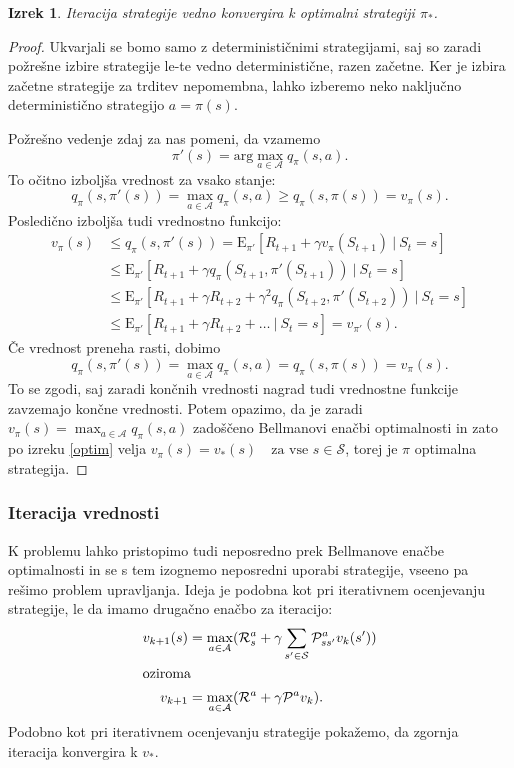 \documentclass[12pt,a4paper]{amsart}
\theoremstyle{definition} %
\theoremstyle{plain} %
\newtheorem{izrek}[definicija]{Izrek}
\begin{document}
\begin{izrek}\label{iterKonv}
    Iteracija strategije vedno konvergira k optimalni strategiji $\pi_*$.
\end{izrek}

\begin{proof}
    Ukvarjali se bomo samo z determinističnimi strategijami, saj so zaradi požrešne izbire 
    strategije le-te vedno deterministične, razen začetne. Ker je izbira začetne strategije za 
    trditev nepomembna, lahko izberemo neko naključno deterministično strategijo $a = \pi(s)$.

    Požrešno vedenje zdaj za nas pomeni, da vzamemo 
    \begin{equation}\label{pozresno}
        \pi'(s) = \text{arg}\max_{a \in \mathcal{A}} q_\pi(s, a).
    \end{equation}
    To očitno izboljša vrednost za vsako stanje:
    $$
    q_\pi(s, \pi'(s)) = \max_{a \in \mathcal{A}} q_\pi(s, a) \geq q_\pi(s, \pi(s)) = v_\pi(s).
    $$
    Posledično izboljša tudi vrednostno funkcijo: 
    \begin{align*}
        v_\pi(s) &\leq q_\pi(s, \pi'(s)) = \mathrm{E}_{\pi'} [R_{t+1} + 
            \gamma v_\pi(S_{t+1})~|~S_t = s] \\
        &\leq \mathrm{E}_{\pi'} [R_{t+1} + \gamma q_\pi(S_{t+1}, \pi'(S_{t+1}))~|~S_t = s] \\
        &\leq \mathrm{E}_{\pi'} [R_{t+1} + \gamma R_{t+2} + 
            \gamma^2 q_\pi(S_{t+2}, \pi'(S_{t+2}))~|~S_t = s] \\
        &\leq \mathrm{E}_{\pi'} [R_{t+1} + \gamma R_{t+2} + \dots~|~S_t = s] = v_{\pi'}(s).
    \end{align*}
Če vrednost preneha rasti, dobimo 
$$
q_\pi(s, \pi'(s)) = \max_{a \in \mathcal{A}} q_\pi(s, a) = q_\pi(s, \pi(s)) = v_\pi(s).
$$
To se zgodi, saj zaradi končnih vrednosti nagrad tudi vrednostne funkcije zavzemajo končne vrednosti. 
Potem opazimo, da je zaradi $v_\pi(s) = \max_{a \in \mathcal{A}} q_\pi(s, a)$ zadoščeno Bellmanovi 
enačbi optimalnosti in zato po izreku \ref{optim} velja $v_\pi(s) = 
v_*(s) \text{ } \text{ za vse } s \in \mathcal{S}$, torej je $\pi$ optimalna strategija.
\end{proof}

\subsubsection{Iteracija vrednosti}
K problemu lahko pristopimo tudi neposredno prek Bellmanove enačbe optimalnosti in se s tem 
izognemo neposredni uporabi strategije, vseeno pa rešimo problem upravljanja. Ideja je podobna kot 
pri iterativnem ocenjevanju strategije, le da imamo drugačno enačbo za iteracijo: 
\begin{align*}
    v_{k+1}(s) &= \max_{a \in \mathcal{A}} ( \mathcal{R}_s^a + 
        \gamma \sum_{s' \in \mathcal{S}} \mathcal{P}_{ss'}^a v_k(s') ) \\
    \intertext{oziroma}
    v_{k+1} &= \max_{a \in \mathcal{A}} (\mathcal{R}^a + \gamma \mathcal{P}^a v_k).
\end{align*}
Podobno kot pri iterativnem ocenjevanju strategije pokažemo, da zgornja iteracija konvergira k 
$v_*$.
\end{document}
